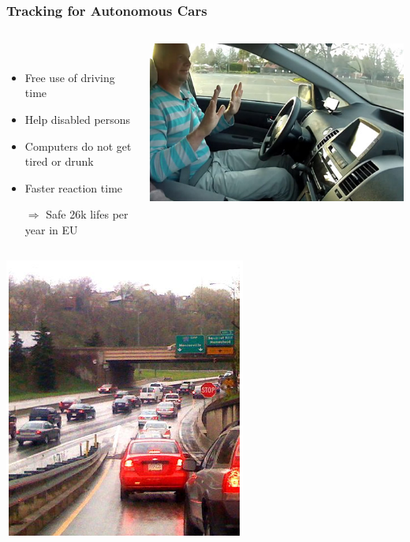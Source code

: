 \begin{frame}
  \frametitle{Tracking for Autonomous Cars}
  
  \begin{columns}
  \begin{column}{0.6\textwidth}
  \begin{description}[]
  \item[Chances] \hfill \\
  \begin{itemize}
  \item Free use of driving time
  \item Help disabled persons
  \item Computers do not get\\tired or drunk
  \item Faster reaction time
  \item[$\Rightarrow$] Safe 26k lifes per year in EU
  \end{itemize}
  \end{description}
  \end{column}
  \begin{column}{0.4\textwidth}
  \includegraphics[width=\textwidth]{images/auto.jpg}
  \end{column}
  \end{columns}
  \pause
  \bigskip
  \begin{columns}
  \begin{column}{0.6\textwidth}
  \includegraphics[height=0.35\textheight]{images/highway}

\end{column}
\end{columns}
\end{frame}
